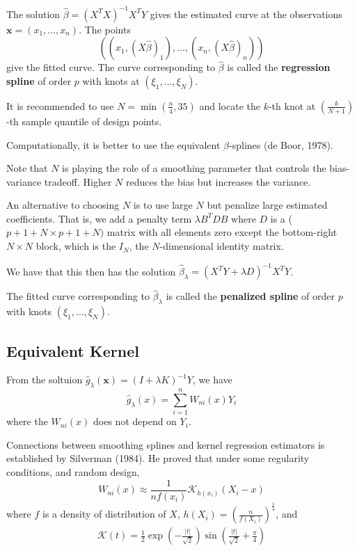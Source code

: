 The solution $\hat \beta = (X^{T} X)^{-1} X^{T} Y$ gives the estimated
curve at the observations $\mathbf{x} = (x_{1}, \dots, x_{n})$.  The
points
\begin{equation}
  \label{eq:85}
  ((x_{1}, (X \hat \beta)_{1}), \dots, (x_{n}, (X \hat \beta)_{n}))
\end{equation} give the fitted curve.  The curve corresponding to
$\hat \beta$ is called the \textbf{regression spline} of order $p$
with knots at $(\xi_{1}, \dots, \xi_{N})$.

It is recommended to use $N = \min(\frac{n}{4}, 35)$ and locate the
$k$-th knot at $(\frac{k}{N+1})$-th sample quantile of design points.

Computationally, it is better to use the equivalent $\beta$-splines
(de Boor, 1978).

Note that $N$ is playing the role of a smoothing parameter that
controls the bias-variance tradeoff. Higher $N$ reduces the bias but
increases the variance.

An alternative to choosing $N$ is to use large $N$ but penalize large
estimated coefficients.  That is, we add a penalty term $\lambda B^{T}
D B$ where $D$ is a ($p+1 + N \times p+1+N)$ matrix with all elements
zero except the bottom-right $N \times N$ block, which is the $I_{N}$,
the $N$-dimensional identity matrix.

We have that this then has the solution $\hat \beta_{\lambda} = (X^{T}
Y + \lambda D)^{-1} X^{T} Y$.

The fitted curve corresponding to $\hat \beta_{\lambda}$ is called the
\textbf{penalized spline} of order $p$ with knots $(\xi_{1}, \dots,
\xi_{N})$.


\subsection{Equivalent Kernel}
\label{sec:equivalent-kernel}

From the soltuion $\hat g_{\lambda}(\mathbf{x}) = (I + \lambda K)^{-1}
Y$, we have
\begin{equation}
  \label{eq:86}
  \hat g_{\lambda}(x) = \sum_{i=1}^{n} W_{ni}(x) Y_{i}
\end{equation} where the $W_{ni}(x)$ does not depend on $Y_{i}$.

Connections between smoothing splines and kernel regression estimators
is established by Silverman (1984).  He proved that under some
regularity conditions, and random design,
\begin{equation}
  \label{eq:87}
  W_{ni}(x) \approx \frac{1}{nf(x_{i})}  \mathcal{K}_{h(x_{i})}(X_{i}
  - x)
\end{equation} where $f$ is a density of distribution of $X$,
$h(X_{i}) = (\frac{n}{f(X_{i})})^{\frac{1}{4}}$, and
\begin{align}
  \label{eq:88}
  \mathcal{K}(t) = \frac{1}{2}  \exp(-\frac{|t|}{\sqrt{2}}) \sin
  (\frac{|t|}{\sqrt{2}} + \frac{\pi}{4})
\end{align}

